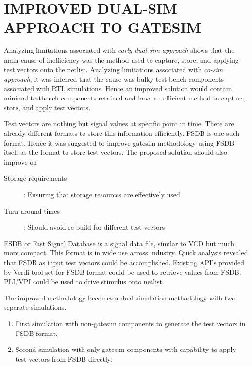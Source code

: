 \chapter{IMPROVED DUAL-SIM APPROACH TO GATESIM}
\label{chap:dualsim.tex}
Analyzing limitations associated with \emph{early dual-sim approach} shows that the main cause of inefficiency was the method used to capture, store, and applying test vectors onto the netlist. Analyzing limitations associated with \emph{co-sim approach}, it was inferred that the cause was bulky test-bench components associated with RTL simulations. Hence an improved solution would contain minimal testbench components retained and have an efficient method to capture, store, and apply test vectors. 

Test vectors are nothing but signal values at specific point in time. There are already different formats to store this information efficiently. FSDB  is one such format. Hence it was suggested to improve gatesim methodology using FSDB itself as the format to store test vectors. The proposed solution should also improve on

\begin{description}
	\item[Storage requirements]: Ensuring that storage resources are effectively used
	\item[Turn-around times]: Should avoid re-build for different test vectors
\end{description}

FSDB\cite{SS:Verdi} or Fast Signal Database is a signal data file, similar to VCD\cite{ieee:v:2005}  but much more compact. This format is in wide use across industry. Quick analysis revealed that FSDB as input test vectors could be accomplished. Existing API's  provided by Verdi\cite{SS:Verdi} tool set for FSDB format could be used to retrieve values from FSDB. PLI$/$VPI\cite{ieee:v:2005} could be used to drive stimulus onto netlist.


The improved methodology becomes a dual-simulation methodology with two separate simulations.
\begin{enumerate}
	\item First simulation with non-gatesim components to generate the test vectors in FSDB format.
	\item Second simulation with only gatesim components with capability to apply test vectors from FSDB directly.
\end{enumerate}



